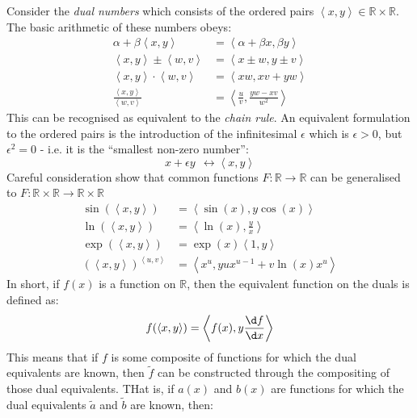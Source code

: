             \newcommand\dual[2]{\left\langle #1 , #2 \right\rangle}
            Consider the \textit{dual numbers} which consists of the ordered pairs $\dual{x}{y} \in \mathbb{R} \times \mathbb{R}$. The basic arithmetic of these numbers obeys:
            \begin{align*}
                \alpha + \beta \dual{x}{y} & = \dual{\alpha + \beta x}{\beta y}
                \\
                \dual{x}{y} \pm  \dual{w}{v} & = \dual{x\pm w}{y \pm v}
                \\
                \dual{x}{y} \cdot \dual{w}{v} & = \dual{xw}{xv + yw}
                \\
                \frac{\dual{x}{y}}{\dual{w}{v}} & = \dual{\frac{u}{v}}{\frac{yw - xv}{w^2}}
            \end{align*}
            This can be recognised as equivalent to the \textit{chain rule}. An equivalent formulation to the ordered pairs is the introduction of the infinitesimal $\epsilon$ which is $\epsilon > 0$, but $\epsilon^2 = 0$ - i.e. it is the ``smallest non-zero number'':
            \begin{equation}
                x + \epsilon y ~~\longleftrightarrow \dual{x}{y}
            \end{equation}
            Careful consideration show that common functions $F: \mathbb{R} \to \mathbb{R}$ can be generalised to $F: \mathbb{R}\times \mathbb{R} \to \mathbb{R}\times \mathbb{R}$
            \begin{align*}
                \sin(\dual{x}{y}) &= \dual{\sin(x)}{y \cos(x)}
                \\
                \ln(\dual{x}{y}) & = \dual{\ln(x)}{\frac{y}{x}}
                \\
                \exp(\dual{x}{y}) &= \exp(x)\dual{1}{y}
                \\
                \left(\dual{x}{y}\right)^{\dual{u}{v}} & = \dual{x^u}{y u x^{u-1} + v \ln(x) x^u}
            \end{align*}
            In short, if $f(x)$ is a function on $\mathbb{R}$, then the equivalent function on the duals is defined as:
            \begin{equation}
                f(\dual{x}{y}) = \dual{f(x)}{y \frac{\d f}{\d x}}
            \end{equation}
            This means that if $f$ is some composite of functions for which the dual equivalents are known, then $\tilde{f}$ can be constructed through the compositing of those dual equivalents. THat is, if $a(x)$ and $b(x)$ are functions for which the dual equivalents $\tilde{a}$ and $\tilde{b}$ are known, then:
